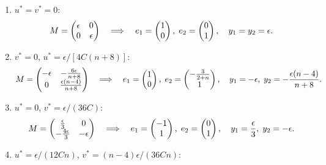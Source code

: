\documentclass[11pt,letter, swedish, english
]{article}
\begin{document}
\begin{enumerate}[label=(\roman*)]
\item $u^*=v^*=0$: 
\[%
M= 
\begin{pmatrix}
\epsilon & 0 \\
0 & \epsilon
\end{pmatrix}
\quad\Longrightarrow\quad
e_1=\begin{pmatrix}
1\\0
\end{pmatrix},\;
e_2=\begin{pmatrix}
0\\1
\end{pmatrix}\qcomma
y_1=y_2=\epsilon.
\]%
\item $v^*=0$, $u^* = \epsilon/[4C(n+8)]$:
\[%
M=
\begin{pmatrix}
-\epsilon & -\frac{6\epsilon}{n+8}\\
0 & \frac{\epsilon(n-4)}{n+8}
\end{pmatrix}
\quad\Longrightarrow\quad
e_1=\begin{pmatrix}
1\\0
\end{pmatrix},\;
e_2=\begin{pmatrix}
-\frac{3}{2+n}\\1
\end{pmatrix}\qcomma
y_1=-\epsilon,\;y_2=-\frac{\epsilon(n-4)}{n+8}.
\]%
\item $u^*=0$, $v^* = \epsilon/(36C)$:
\[%
M=
\begin{pmatrix}
\frac{\epsilon}{3}   & 0 \\
-\frac{4\epsilon}{3} & -\epsilon
\end{pmatrix}
\quad\Longrightarrow\quad
e_1=\begin{pmatrix}
-1\\1
\end{pmatrix},\;
e_2=\begin{pmatrix}
0\\1
\end{pmatrix}\qcomma
y_1=\frac{\epsilon}{3},\;y_2=-\epsilon.
\]%
\item $u^* = \epsilon/(12Cn)$, $v^* = (n-4)\epsilon/(36Cn)$:
\[%
\]
\end{enumerate}
\end{document}
